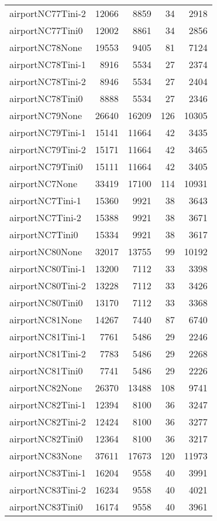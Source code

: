 \begin{longtable}{lrrrr}
airportNC77Tini-2 & 12066 & 8859 & 34 & 2918 \\
airportNC77Tini0 & 12002 & 8861 & 34 & 2856 \\
airportNC78None & 19553 & 9405 & 81 & 7124 \\
airportNC78Tini-1 & 8916 & 5534 & 27 & 2374 \\
airportNC78Tini-2 & 8946 & 5534 & 27 & 2404 \\
airportNC78Tini0 & 8888 & 5534 & 27 & 2346 \\
airportNC79None & 26640 & 16209 & 126 & 10305 \\
airportNC79Tini-1 & 15141 & 11664 & 42 & 3435 \\
airportNC79Tini-2 & 15171 & 11664 & 42 & 3465 \\
airportNC79Tini0 & 15111 & 11664 & 42 & 3405 \\
airportNC7None & 33419 & 17100 & 114 & 10931 \\
airportNC7Tini-1 & 15360 & 9921 & 38 & 3643 \\
airportNC7Tini-2 & 15388 & 9921 & 38 & 3671 \\
airportNC7Tini0 & 15334 & 9921 & 38 & 3617 \\
airportNC80None & 32017 & 13755 & 99 & 10192 \\
airportNC80Tini-1 & 13200 & 7112 & 33 & 3398 \\
airportNC80Tini-2 & 13228 & 7112 & 33 & 3426 \\
airportNC80Tini0 & 13170 & 7112 & 33 & 3368 \\
airportNC81None & 14267 & 7440 & 87 & 6740 \\
airportNC81Tini-1 & 7761 & 5486 & 29 & 2246 \\
airportNC81Tini-2 & 7783 & 5486 & 29 & 2268 \\
airportNC81Tini0 & 7741 & 5486 & 29 & 2226 \\
airportNC82None & 26370 & 13488 & 108 & 9741 \\
airportNC82Tini-1 & 12394 & 8100 & 36 & 3247 \\
airportNC82Tini-2 & 12424 & 8100 & 36 & 3277 \\
airportNC82Tini0 & 12364 & 8100 & 36 & 3217 \\
airportNC83None & 37611 & 17673 & 120 & 11973 \\
airportNC83Tini-1 & 16204 & 9558 & 40 & 3991 \\
airportNC83Tini-2 & 16234 & 9558 & 40 & 4021 \\
airportNC83Tini0 & 16174 & 9558 & 40 & 3961 \\

\end{longtable}
